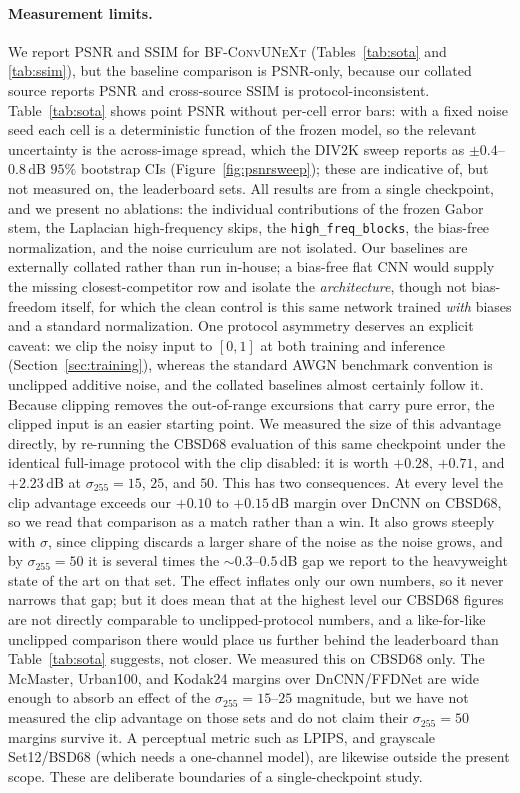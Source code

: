 \documentclass{article}
\newcommand{\model}{\textsc{BF-ConvUNeXt}}
\begin{document}
\paragraph{Measurement limits.}
We report PSNR and SSIM for \model{} (Tables~\ref{tab:sota} and \ref{tab:ssim}), but the baseline comparison is PSNR-only, because our collated source \citep{zhang2022scunet} reports PSNR and cross-source SSIM is protocol-inconsistent. Table~\ref{tab:sota} shows point PSNR without per-cell error bars: with a fixed noise seed each cell is a deterministic function of the frozen model, so the relevant uncertainty is the across-image spread, which the DIV2K sweep reports as $\pm0.4$--$0.8$\,dB $95\%$ bootstrap CIs (Figure~\ref{fig:psnrsweep}); these are indicative of, but not measured on, the leaderboard sets. All results are from a single checkpoint, and we present no ablations: the individual contributions of the frozen Gabor stem, the Laplacian high-frequency skips, the \texttt{high\_freq\_blocks}, the bias-free normalization, and the noise curriculum are not isolated. Our baselines are externally collated rather than run in-house; a bias-free flat CNN would supply the missing closest-competitor row and isolate the \emph{architecture}, though not bias-freedom itself, for which the clean control is this same network trained \emph{with} biases and a standard normalization. One protocol asymmetry deserves an explicit caveat: we clip the noisy input to $[0,1]$ at both training and inference (Section~\ref{sec:training}), whereas the standard AWGN benchmark convention is unclipped additive noise, and the collated baselines almost certainly follow it. Because clipping removes the out-of-range excursions that carry pure error, the clipped input is an easier starting point. We measured the size of this advantage directly, by re-running the CBSD68 evaluation of this same checkpoint under the identical full-image protocol with the clip disabled: it is worth $+0.28$, $+0.71$, and $+2.23$\,dB at $\sigma_{255}{=}15$, $25$, and $50$. This has two consequences. At every level the clip advantage exceeds our $+0.10$ to $+0.15$\,dB margin over DnCNN on CBSD68, so we read that comparison as a match rather than a win. It also grows steeply with $\sigma$, since clipping discards a larger share of the noise as the noise grows, and by $\sigma_{255}{=}50$ it is several times the $\sim0.3$--$0.5$\,dB gap we report to the heavyweight state of the art on that set. The effect inflates only our own numbers, so it never narrows that gap; but it does mean that at the highest level our CBSD68 figures are not directly comparable to unclipped-protocol numbers, and a like-for-like unclipped comparison there would place us further behind the leaderboard than Table~\ref{tab:sota} suggests, not closer. We measured this on CBSD68 only. The McMaster, Urban100, and Kodak24 margins over DnCNN/FFDNet are wide enough to absorb an effect of the $\sigma_{255}{=}15$--$25$ magnitude, but we have not measured the clip advantage on those sets and do not claim their $\sigma_{255}{=}50$ margins survive it. A perceptual metric such as LPIPS, and grayscale Set12/BSD68 (which needs a one-channel model), are likewise outside the present scope. These are deliberate boundaries of a single-checkpoint study.
\end{document}
